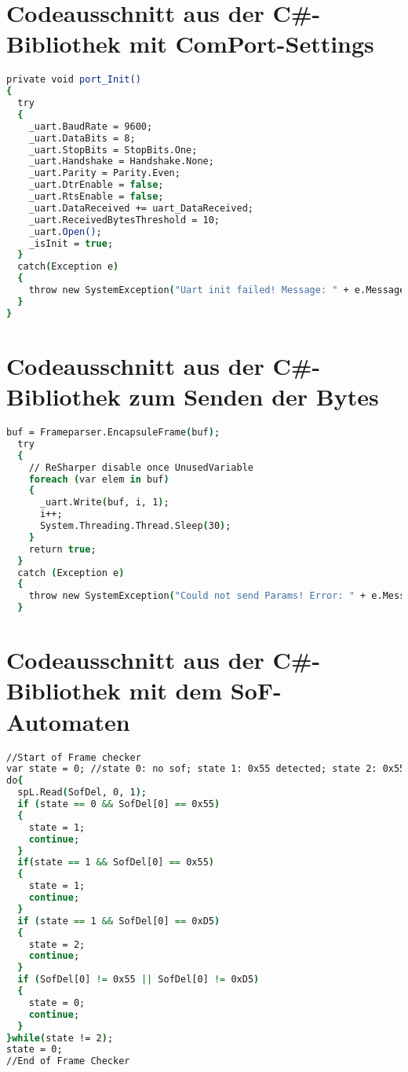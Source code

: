 \chapter{Codeausschnitt aus der C\#-Bibliothek mit ComPort-Settings}
\label{ComAPP:ComPortSettings}
\begin{lstlisting}[frame=single, language=csh]
private void port_Init()
{
  try
  {
    _uart.BaudRate = 9600;
    _uart.DataBits = 8;
    _uart.StopBits = StopBits.One;
    _uart.Handshake = Handshake.None;
    _uart.Parity = Parity.Even;
    _uart.DtrEnable = false;
    _uart.RtsEnable = false;
    _uart.DataReceived += uart_DataReceived;
    _uart.ReceivedBytesThreshold = 10;
    _uart.Open();
    _isInit = true;
  }
  catch(Exception e)
  {
    throw new SystemException("Uart init failed! Message: " + e.Message);
  }
}
\end{lstlisting}
\chapter{Codeausschnitt aus der C\#-Bibliothek zum Senden der Bytes}
\label{ComAPP:SendWait}
\begin{lstlisting}[frame=single, language=csh]
  buf = Frameparser.EncapsuleFrame(buf);
  try
  {
    // ReSharper disable once UnusedVariable
    foreach (var elem in buf)
    {
      _uart.Write(buf, i, 1);
      i++;
      System.Threading.Thread.Sleep(30);
    }
    return true;
  }
  catch (Exception e)
  {
    throw new SystemException("Could not send Params! Error: " + e.Message);
  }
\end{lstlisting}

\chapter{Codeausschnitt aus der C\#-Bibliothek mit dem SoF-Automaten}
\label{ComAPP:SoFMachine}
\begin{lstlisting}[frame=single, language=csh]
//Start of Frame checker
var state = 0; //state 0: no sof; state 1: 0x55 detected; state 2: 0x55 and 0xD5 detected
do{
  spL.Read(SofDel, 0, 1);
  if (state == 0 && SofDel[0] == 0x55)
  {
    state = 1;
    continue;
  }
  if(state == 1 && SofDel[0] == 0x55)
  {
    state = 1;
    continue;
  }
  if (state == 1 && SofDel[0] == 0xD5)
  {
    state = 2;
    continue;
  }
  if (SofDel[0] != 0x55 || SofDel[0] != 0xD5)
  {
    state = 0;
    continue;
  }
}while(state != 2);
state = 0;
//End of Frame Checker
\end{lstlisting}
